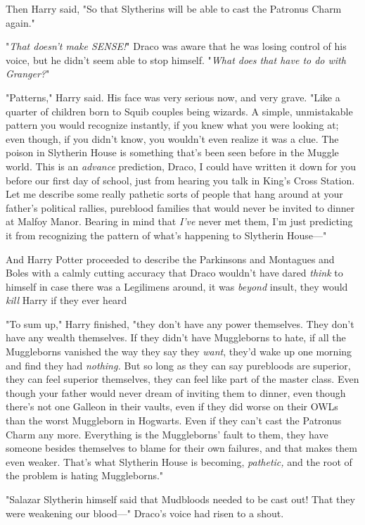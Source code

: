 Then Harry said, "So that Slytherins will be able to cast the Patronus Charm
again."

"\emph{That{\el} doesn't{\el} make{\el} SENSE!}" Draco was aware that
he was losing control of his voice, but he didn't seem able to stop himself.
"\emph{What does that have to do with Granger?}"

"Patterns," Harry said. His face was very serious now, and very grave. "Like a
quarter of children born to Squib couples being wizards. A simple, unmistakable
pattern you would recognize instantly, if you knew what you were looking at;
even though, if you didn't know, you wouldn't even realize it was a clue. The
poison in Slytherin House is something that's been seen before in the Muggle
world. This is an \emph{advance} prediction, Draco, I could have written it
down for you before our first day of school, just from hearing you talk in
King's Cross Station. Let me describe some really pathetic sorts of people that
hang around at your father's political rallies, pureblood families that would
never be invited to dinner at Malfoy Manor. Bearing in mind that \emph{I've}
never met them, I'm just predicting it from recognizing the pattern of what's
happening to Slytherin House\mbox{---}"

And Harry Potter proceeded to describe the Parkinsons and Montagues and Boles
with a calmly cutting accuracy that Draco wouldn't have dared \emph{think} to
himself in case there was a Legilimens around, it was \emph{beyond} insult,
they would \emph{kill} Harry if they ever heard{\el}

"To sum up," Harry finished, "they don't have any power themselves. They don't
have any wealth themselves. If they didn't have Muggleborns to hate, if all the
Muggleborns vanished the way they say they \emph{want}, they'd wake up one
morning and find they had \emph{nothing.} But so long as they can say
purebloods are superior, they can feel superior themselves, they can feel like
part of the master class. Even though your father would never dream of inviting
them to dinner, even though there's not one Galleon in their vaults, even if
they did worse on their OWLs than the worst Muggleborn in Hogwarts. Even if
they can't cast the Patronus Charm any more. Everything is the Muggleborns'
fault to them, they have someone besides themselves to blame for their own
failures, and that makes them even weaker. That's what Slytherin House is
becoming, \emph{pathetic,} and the root of the problem is hating Muggleborns."

"Salazar Slytherin himself said that Mudbloods needed to be cast out! That they
were weakening our blood\mbox{---}" Draco's voice had risen to a shout.

